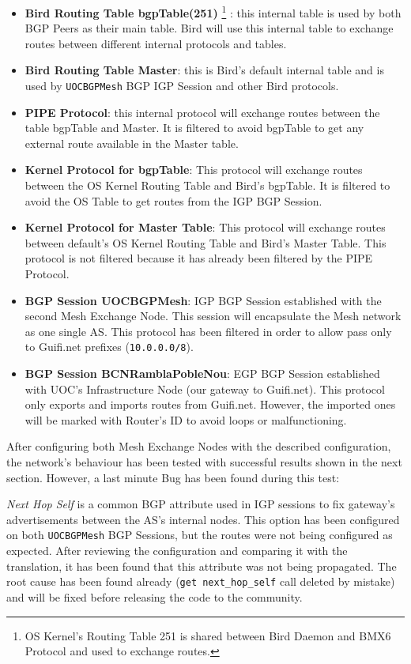\begin{itemize}
    \item \textbf{Bird Routing Table bgpTable(251)} \footnote{OS Kernel's Routing Table 251 is shared between Bird Daemon and BMX6 Protocol and used to exchange routes.} : this internal table is used by both BGP Peers as their main table. Bird will use this internal table to exchange routes between different internal protocols and tables.
    \item \textbf{Bird Routing Table Master}: this is Bird's default internal table and is used by \texttt{UOCBGPMesh} BGP IGP Session and other Bird protocols.
    \item \textbf{PIPE Protocol}: this internal protocol will exchange routes between the table bgpTable and Master. It is filtered to avoid bgpTable to get any external route available in the Master table.
    \item \textbf{Kernel Protocol for bgpTable}: This protocol will exchange routes between the OS Kernel Routing Table and Bird's bgpTable. It is filtered to avoid the OS Table to get routes from the IGP BGP Session.
    \item \textbf{Kernel Protocol for Master Table}: This protocol will exchange routes between default's OS Kernel Routing Table and Bird's Master Table. This protocol is not filtered because it has already been filtered by the PIPE Protocol.
    \item \textbf{BGP Session UOCBGPMesh}: IGP BGP Session established with the second Mesh Exchange Node. This session will encapsulate the Mesh network as one single AS. This protocol has been filtered in order to allow pass only to Guifi.net prefixes (\texttt{10.0.0.0/8}).
    \item \textbf{BGP Session BCNRamblaPobleNou}: EGP BGP Session established with UOC's Infrastructure Node (our gateway to Guifi.net). This protocol only exports and imports routes from Guifi.net. However, the imported ones will be marked with Router's ID to avoid loops or malfunctioning.
\end{itemize}

After configuring both Mesh Exchange Nodes with the described configuration, the network's behaviour has been tested with successful results shown in the next section. However, a last minute Bug has been found during this test:

\textit{Next Hop Self} is a common BGP attribute used in IGP sessions to fix gateway's advertisements between the AS's internal nodes. This option has been configured on both \texttt{UOCBGPMesh} BGP Sessions, but the routes were not being configured as expected. After reviewing the configuration and comparing it with the translation, it has been found that this attribute was not being propagated. The root cause has been found already (\texttt{get next\_hop\_self} call deleted by mistake) and will be fixed before releasing the code to the community.



